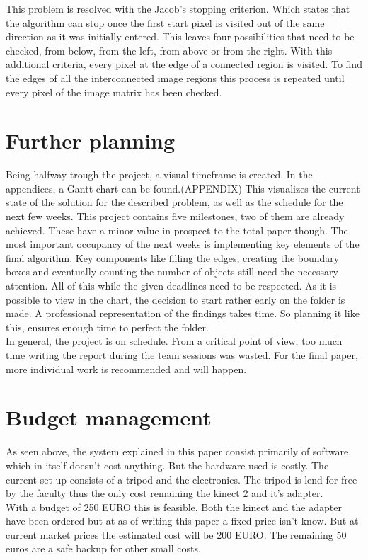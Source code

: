 \documentclass[11pt]{article}
\begin{document}
This problem is resolved with the Jacob's stopping criterion. Which states that the algorithm can stop once the first start pixel is visited out of the same direction as it was initially entered. This leaves four possibilities that need to be checked, from below, from the left, from above or from the right. With this additional criteria, every pixel at the edge of a connected region is visited. 
To find the edges of all the interconnected image regions this process is repeated until every pixel of the image matrix has been checked. 

\section{Further planning}

Being halfway trough the project, a visual timeframe is created. In the appendices, a Gantt chart can be found.(APPENDIX) 
This visualizes the current state of the solution for the described problem, as well as the schedule for the next few weeks. 
This project contains five milestones, two of them are already achieved. These have a minor value in prospect to the total paper though. The most important occupancy of the next weeks is implementing key elements of the final algorithm. Key components like filling the edges, creating the boundary boxes and eventually counting the number of objects still need the necessary attention. All of this while the given deadlines need to be respected. As it is possible to view in the chart, the decision to start rather early on the folder is made. A professional representation of the findings takes time. So planning it like this, ensures enough time to perfect the folder. \\
In general, the project is on schedule. From a critical point of view, too much time writing the report during the team sessions was wasted. For the final paper, more individual work is recommended and will happen.

\section{Budget management}

As seen above, the system explained in this paper consist primarily of software which in itself doesn't cost anything. But the hardware used is costly. The current set-up consists of a tripod and the electronics. The tripod is lend for free by the faculty thus the only cost remaining the kinect 2 and it's adapter.\\
With a budget of 250 EURO this is feasible. Both the kinect and the adapter have been ordered but at as of writing this paper a fixed price isn't know. But at current market prices the estimated cost will be 200 EURO. The remaining 50 euros are a safe backup for other small costs.
\end{document}
